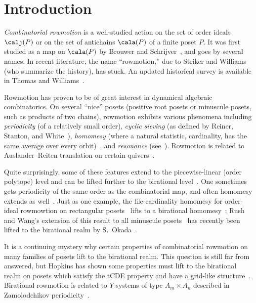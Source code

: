 \section{Introduction}\label{sec:intro}

\textit{Combinatorial rowmotion} is a well-studied action on the set of order ideals
$\calj(P)$ or on the set of antichains $\cala(P)$ of a finite poset $P$. 
It was first studied as a map on $\cala(P)$
by Brouwer and Schrijver~\cite{brouwer1974period}, and goes by several names. In recent literature, the name 
``rowmotion,'' due to Striker and Williams~\cite{strikerwilliams} (who summarize the
history), has stuck. An updated historical survey is available in Thomas and
Williams~\cite[\S~7]{rowmotion-in-slow-motion}.

Rowmotion has proven to be of great interest in dynamical algebraic combinatorics. On
several ``nice'' posets (\eg positive root posets or minuscule posets, such as products of
two chains), rowmotion exhibits various phenomena including \emph{periodicity} (of a relatively
small order), \emph{cyclic sieving} (as defined by Reiner, Stanton, and White~\cite{csp}),
\emph{homomesy} (where a natural statistic, \eg cardinality, has the same average over every
orbit)~\cite{ast,shahrzad,indepsetspaper,panyushev,propproby,rush-wang-homomesy-minuscule,vorland-thesis,vorland-3-chains},
and \emph{resonance} (see~\cite{dpsresonance,dilks-striker-vorland}).
Rowmotion is related to Auslander--Reiten translation on certain quivers~\cite{Yil17}. 

Quite surprisingly, some of these features extend to the piecewise-linear (order polytope)
level and can be lifted further to the birational level~\cite{einpropp}. One sometimes
gets periodicity of the same order as the combinatorial map, and often homomesy extends as
well~\cite{GrRo15,GrRo16,musiker-roby}. Just as one example, the file-cardinality homomesy
for order-ideal rowmowtion on rectangular posets~\cite[Thm.~19ff]{propproby} lifts to a birational
homomesy~\cite[Thm.~2.16]{musiker-roby}; Rush and Wang's extension of this result to all minuscule
posets~\cite[Thm.~1.2]{rush-wang-homomesy-minuscule} has recently been lifted to the birational
realm by S.~Okada~\cite{okada-minuscule}.


It is a continuing mystery why certain properties of combinatorial rowmotion on
many families of posets lift to the birational realm.
This question is still far from answered, but Hopkins has shown
some properties must lift to the birational realm on posets which satisfy the tCDE property and have a grid-like structure~\cite{hopkins2019minuscule}.
Birational rowmotion is related to $Y$-systems of type $A_m \times A_n$ described in
Zamolodchikov periodicity~\cite[\S~4.4]{robydac}.

